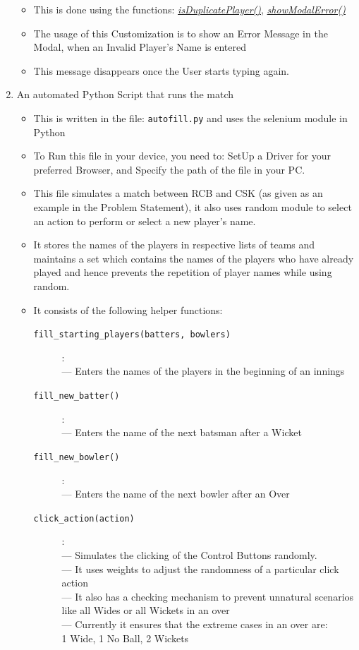 \documentclass[a4paper,12pt]{article}
\begin{document}
\begin{enumerate}
  \begin{itemize}
  \item This is done using the functions: \hyperref[error1]{\textit{isDuplicatePlayer()}}, \hyperref[error2]{\textit{showModalError()}}
  \item The usage of this Customization is to show an Error Message in the Modal, when an Invalid Player's Name is entered
  \item This message disappears once the User starts typing again.
  \end{itemize}
\item An automated Python Script that runs the match
  \begin{itemize}
  \item This is written in the file: \texttt{autofill.py} and uses the selenium module in Python
  \item To Run this file in your device, you need to: SetUp a Driver for your preferred Browser, and Specify the path of the file in your PC.
  \item This file simulates a match between RCB and CSK (as given as an example in the Problem Statement), it also uses random module to select an action to perform or select a new player's name.
  \item It stores the names of the players in respective lists of teams and maintains a set which contains the names of the players who have already played and hence prevents the repetition of player names while using random.
  \item It consists of the following helper functions:
    \begin{description}
      \item [\texttt{fill\_starting\_players(batters, bowlers)}]: \\ --- Enters the names of the players in the beginning of an innings
      \item [\texttt{fill\_new\_batter()}]: \\ --- Enters the name of the next batsman after a Wicket
      \item [\texttt{fill\_new\_bowler()}]: \\ --- Enters the name of the next bowler after an Over
      \item [\texttt{click\_action(action)}]: \\ --- Simulates the clicking of the Control Buttons randomly. \\ --- It uses weights to adjust the randomness of a particular click action \\ --- It also has a checking mechanism to prevent unnatural scenarios like \hspace*{0.45cm} all Wides or all Wickets in an over \\ --- Currently it ensures that the extreme cases in an over are: \\ \hspace*{0.45cm} 1 Wide, 1 No Ball, 2 Wickets

\end{description}
\end{itemize}
\end{enumerate}
\end{document}
